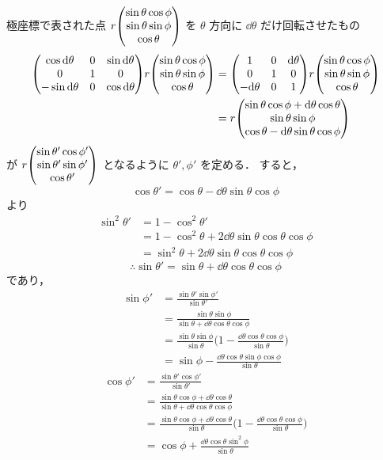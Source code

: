 \documentclass[uplatex]{jsarticle}
\begin{document}
極座標で表された点 $ r \mqty( \sin\theta\cos\phi \\ \sin\theta\sin\phi \\ \cos\theta ) $ を
$ \theta $ 方向に $ \dd\theta $ だけ回転させたもの
\begin{align*}
	\mqty( \cos\dd\theta & 0 & \sin\dd\theta \\ 0 & 1 & 0 \\ -\sin\dd\theta & 0 & \cos\dd\theta )
	r \mqty( \sin\theta\cos\phi \\ \sin\theta\sin\phi \\ \cos\theta )
	&= \mqty( 1 & 0 & \dd\theta \\ 0 & 1 & 0 \\ -\dd\theta & 0 & 1 )
	r \mqty( \sin\theta\cos\phi \\ \sin\theta\sin\phi \\ \cos\theta ) \\
	&= r \mqty( \sin\theta\cos\phi + \dd\theta\cos\theta \\ \sin\theta\sin\phi \\ \cos\theta - \dd\theta\sin\theta\cos\phi )
\end{align*}
が $ r\mqty( \sin\theta'\cos\phi' \\ \sin\theta'\sin\phi' \\ \cos\theta' ) $ となるように $ \theta', \phi' $ を定める．
すると，
\[
	\cos\theta' = \cos\theta - \dd\theta\sin\theta\cos\phi
\]
より
\begin{align*}
	\sin^2\theta'
	&= 1 - \cos^2\theta' \\
	&= 1 - \cos^2\theta + 2\dd\theta\sin\theta\cos\theta\cos\phi \\
	&= \sin^2\theta + 2\dd\theta\sin\theta\cos\theta\cos\phi
\end{align*}
\[
	\therefore \sin\theta' = \sin\theta + \dd\theta\cos\theta\cos\phi
\]
であり，
\begin{align*}
	\sin\phi'
	&= \frac{\sin\theta'\sin\phi'}{\sin\theta'} \\
	&= \frac{\sin\theta\sin\phi}{\sin\theta + \dd\theta\cos\theta\cos\phi} \\
	&= \frac{\sin\theta\sin\phi}{\sin\theta}\biggl(1 - \frac{\dd\theta\cos\theta\cos\phi}{\sin\theta}\biggr) \\
	&= \sin\phi - \frac{\dd\theta\cos\theta\sin\phi\cos\phi}{\sin\theta}
\end{align*}
\begin{align*}
	\cos\phi'
	&= \frac{\sin\theta'\cos\phi'}{\sin\theta'} \\
	&= \frac{\sin\theta\cos\phi + \dd\theta\cos\theta}{\sin\theta + \dd\theta\cos\theta\cos\phi} \\
	&= \frac{\sin\theta\cos\phi + \dd\theta\cos\theta}{\sin\theta}\biggl(1 - \frac{\dd\theta\cos\theta\cos\phi}{\sin\theta}\biggr) \\
	&= \cos\phi + \frac{\dd\theta\cos\theta\sin^2\phi}{\sin\theta}
\end{align*}
\end{document}
